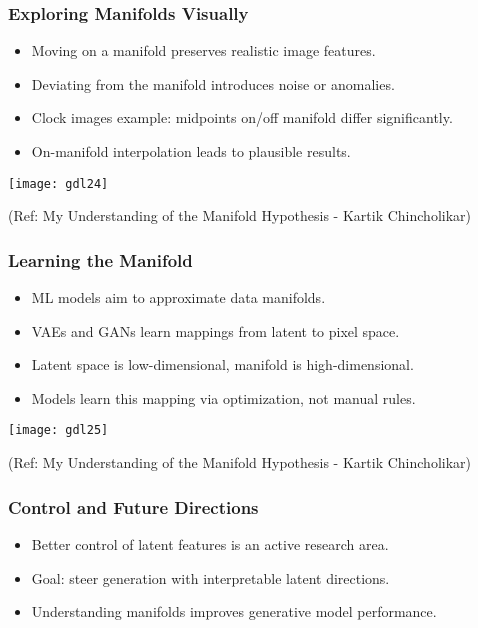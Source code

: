 \begin{frame}[fragile]\frametitle{Exploring Manifolds Visually}
    \begin{itemize}
        \item Moving on a manifold preserves realistic image features.
        \item Deviating from the manifold introduces noise or anomalies.
        \item Clock images example: midpoints on/off manifold differ significantly.
        \item On-manifold interpolation leads to plausible results.
    \end{itemize}
	
\begin{center}
\texttt{[image: gdl24]}

{\tiny (Ref: My Understanding of the Manifold Hypothesis - Kartik Chincholikar)}	

\end{center}		
\end{frame}

\begin{frame}[fragile]\frametitle{Learning the Manifold}
    \begin{itemize}
        \item ML models aim to approximate data manifolds.
        \item VAEs and GANs learn mappings from latent to pixel space.
        \item Latent space is low-dimensional, manifold is high-dimensional.
        \item Models learn this mapping via optimization, not manual rules.
    \end{itemize}
	
\begin{center}
\texttt{[image: gdl25]}

{\tiny (Ref: My Understanding of the Manifold Hypothesis - Kartik Chincholikar)}	

\end{center}	
\end{frame}

\begin{frame}[fragile]\frametitle{Control and Future Directions}
    \begin{itemize}
        \item Better control of latent features is an active research area.
        \item Goal: steer generation with interpretable latent directions.
        \item Understanding manifolds improves generative model performance.
    \end{itemize}
\end{frame}

